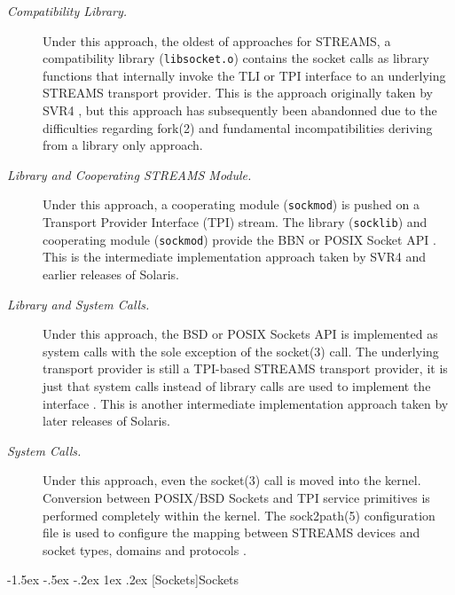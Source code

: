 \documentclass[letterpaper,final,notitlepage,twocolumn,10pt,twoside]{article}
\makeatletter
\renewcommand\subsection{\@startsection{subsection}{2}{\z@}%
                                     {-1.5ex \@plus -.5ex \@minus -.2ex}%
                                     {1ex \@plus .2ex}%
                                     {\normalfont\normalsize\bfseries}}
\makeatother
\begin{document}
\begin{description}

\item[{\it Compatibility Library.}]

Under this approach, the oldest of approaches for STREAMS, a compatibility
library (\texttt{libsocket.o}) contains the socket calls as library functions
that internally invoke the TLI or TPI interface to an underlying STREAMS
transport provider.  This is the approach originally taken by SVR4
\cite[]{magic}, but this approach has subsequently been abandonned due to the
difficulties regarding fork(2) and fundamental incompatibilities deriving from
a library only approach.

\item[{\it Library and Cooperating STREAMS Module.}]

Under this approach, a cooperating module (\texttt{sockmod}) is pushed on a
Transport Provider Interface (TPI) stream.  The library (\texttt{socklib}) and
cooperating module (\texttt{sockmod}) provide the BBN or POSIX Socket
API \cite[]{impbsd} \cite[]{socklib}.  This is the intermediate implementation
approach taken by SVR4 and earlier releases of Solaris.

\item[{\it Library and System Calls.}]

Under this approach, the BSD or POSIX Sockets API is implemented as system
calls with the sole exception of the socket(3) call.  The underlying transport
provider is still a TPI-based STREAMS transport provider, it is just that
system calls instead of library calls are used to implement the interface
\cite[]{socklib}.  This is another intermediate implementation approach taken
by later releases of Solaris.

\item[{\it System Calls.}]

Under this approach, even the socket(3) call is moved into the kernel.
Conversion between POSIX/BSD Sockets and TPI service primitives is performed
completely within the kernel.  The sock2path(5) configuration file is used to
configure the mapping between STREAMS devices and socket types, domains and
protocols \cite[]{socklib}.

\end{description}

\subsection[Sockets]{Sockets}
\end{document}
